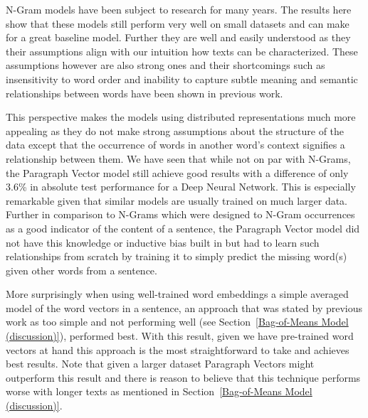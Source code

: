 N-Gram models have been subject to research for many years. The results here show that these models still perform very well on small datasets and can make for a great baseline model. Further they are well and easily understood as they their assumptions align with our intuition how texts can be characterized. These assumptions however are also strong ones and their shortcomings such as insensitivity to word order and inability to capture subtle meaning and semantic relationships between words have been shown in previous work.

This perspective makes the models using distributed representations much more appealing as they do not make strong assumptions about the structure of the data except that the occurrence of words in another word's context signifies a relationship between them. We have seen that while not on par with N-Grams, the Paragraph Vector model still achieve good results with a difference of only 3.6\% in absolute test performance for a Deep Neural Network. This is especially remarkable given that similar models are usually trained on much larger data. Further in comparison to N-Grams which were designed to N-Gram occurrences as a good indicator of the content of a sentence, the Paragraph Vector model did not have this knowledge or inductive bias built in but had to learn such relationships from scratch by training it to simply predict the missing word(s) given other words from a sentence.

More surprisingly when using well-trained word embeddings a simple averaged model of the word vectors in a sentence, an approach that was stated by previous work as too simple and not performing well (see Section~\ref{Bag-of-Means Model (discussion)}), performed best. With this result, given we have pre-trained word vectors at hand this approach is the most straightforward to take and achieves best results. Note that given a larger dataset Paragraph Vectors might outperform this result and there is reason to believe that this technique performs worse with longer texts as mentioned in Section~\ref{Bag-of-Means Model (discussion)}.



%
%
%
%
%
%
%
%
%
%



